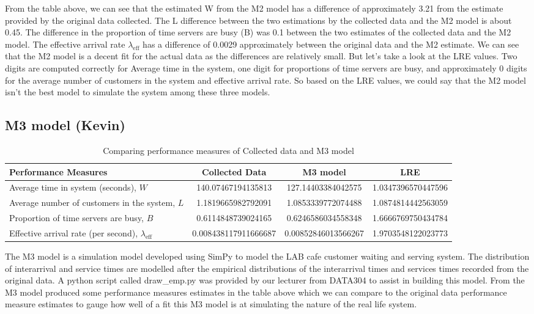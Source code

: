 \documentclass{article}
\begin{document}
From the table above, we can see that the estimated W from the M2 model has a difference of approximately 3.21 from the estimate provided by the original data collected. The L difference between the two estimations by the collected data and the M2 model is about 0.45. The difference in the proportion of time servers are busy (B) was 0.1 between the two estimates of the collected data and the M2 model. The effective arrival rate $\lambda_{\text{eff}}$ has a difference of 0.0029 approximately between the original data and the M2 estimate. We can see that the M2 model is a decent fit for the actual data as the differences are relatively small. But let's take a look at the LRE values. Two digits are computed correctly for Average time in the system, one digit for proportions of time servers are busy, and approximately 0 digits for the average number of customers in the system and effective arrival rate. So based on the LRE values, we could say that the M2 model isn’t the best model to simulate the system among these three models.

\subsection{M3 model (Kevin)}

\begin{table}[H]
    \centering
    \caption{Comparing performance measures of Collected data and M3 model}
    \begin{tabu}{X S S S}
        \toprule
        \textbf{Performance Measures} & \textbf{Collected Data} & \textbf{M3 model}& \textbf{LRE}\\
        \midrule
        Average time in system (seconds), $W$ & 140.07467194135813 & 127.14403384042575 & 1.0347396570447596\\
        Average number of customers in the system, $L$ & 1.1819665982792091 & 1.0853339772074488 & 1.0874814442563059\\
        Proportion of time servers are busy, $B$ & 0.6114848739024165 & 0.6246586034558348 & 1.6666769750434784\\
        Effective arrival rate (per second), $\lambda_{\text{eff}}$ & 0.008438117911666687 & 0.00852846013566267 & 1.9703548122023773\\
        \bottomrule
    \end{tabu}
    \label{tab:M3}
\end{table}

The M3 model is a simulation model developed using SimPy to model the LAB cafe customer waiting and serving system. The distribution of interarrival and service times are modelled after the empirical distributions of the interarrival times and services times recorded from the original data. A python script called draw\_emp.py was provided by our lecturer\cite{drawemp} from DATA304 to assist in building this model. From the M3 model produced some performance measures estimates in the table above which we can compare to the original data performance measure estimates to gauge how well of a fit this M3 model is at simulating the nature of the real life system.
\end{document}
